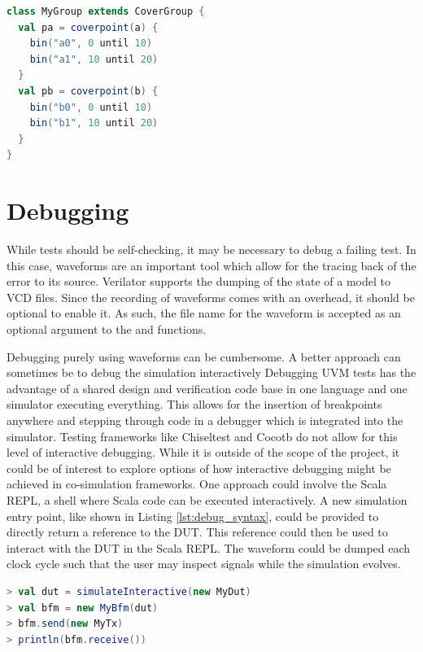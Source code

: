\begin{listing}
\begin{lstlisting}[language=scala, captionpos=b, caption=Outline of the syntax for the collection of functional coverage.,label=lst:cover_syntax]
class MyGroup extends CoverGroup {
  val pa = coverpoint(a) {
    bin("a0", 0 until 10)
    bin("a1", 10 until 20)
  }
  val pb = coverpoint(b) {
    bin("b0", 0 until 10)
    bin("b1", 10 until 20)
  }
}
\end{lstlisting}
\end{listing}

\section{Debugging} %

While tests should be self-checking, it may be necessary to debug a failing test. In this case, waveforms are an
important tool which allow for the tracing back of the error to its source. Verilator supports the dumping of the
state of a model to VCD files. Since the recording of waveforms comes with an overhead, it should be optional to
enable it. As such, the file name for the waveform is accepted as an optional argument to the  and
 functions.

Debugging purely using waveforms can be cumbersome. A better approach can sometimes be to debug the simulation
interactively Debugging UVM tests has the advantage of a shared design and verification code base in one language and
one simulator executing everything. This allows for the insertion of breakpoints anywhere and stepping through code
in a debugger which is integrated into the simulator. Testing frameworks like Chiseltest and Cocotb do not allow for
this level of interactive debugging. While it is outside of the scope of the project, it could be of interest to
explore options of how interactive debugging might be achieved in co-simulation frameworks. One approach could
involve the Scala REPL, a shell where Scala code can be executed interactively. A new simulation entry point, like
shown in Listing \ref{lst:debug_syntax}, could be provided to directly return a reference to the DUT. This reference
could then be used to interact with the DUT in the Scala REPL. The waveform could be dumped each clock cycle such
that the user may inspect signals while the simulation evolves.

\begin{listing}
\begin{lstlisting}[language=scala, captionpos=b, caption=Outline of the syntax for the collection of functional coverage.,label=lst:debug_syntax]
> val dut = simulateInteractive(new MyDut)
> val bfm = new MyBfm(dut)
> bfm.send(new MyTx)
> println(bfm.receive())
\end{lstlisting}
\end{listing}

